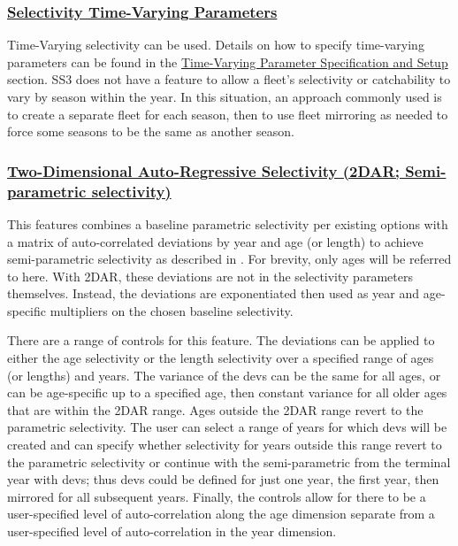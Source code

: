 \hypertarget{Selex-TV}{}
\subsubsection[Selectivity Time-Varying Parameters]{\protect\hyperlink{Selex-TV}{Selectivity Time-Varying Parameters}}
Time-Varying selectivity can be used. Details on how to specify time-varying parameters can be found in the \hyperlink{tvOrder}{Time-Varying Parameter Specification and Setup} section. SS3 does not have a feature to allow a fleet's selectivity or catchability to vary by season within the year. In this situation, an approach commonly used is to create a separate fleet for each season, then to use fleet mirroring as needed to force some seasons to be the same as another season.

\hypertarget{TwoDAR}{}
\subsubsection[Two-Dimensional Auto-Regressive Selectivity (2DAR; Semi-parametric selectivity)]{\protect\hyperlink{TwoDAR}{Two-Dimensional Auto-Regressive Selectivity (2DAR; Semi-parametric selectivity)}}
This features combines a baseline parametric selectivity per existing options with a matrix of auto-correlated deviations by year and age (or length) to achieve semi-parametric selectivity as described in \citet{xu-new-2019}. For brevity, only ages will be referred to here. With 2DAR, these deviations are not in the selectivity parameters themselves. Instead, the deviations are exponentiated then used as year and age-specific multipliers on the chosen baseline selectivity.

There are a range of controls for this feature. The deviations can be applied to either the age selectivity or the length selectivity over a specified range of ages (or lengths) and years. The variance of the devs can be the same for all ages, or can be age-specific up to a specified age, then constant variance for all older ages that are within the 2DAR range. Ages outside the 2DAR range revert to the parametric selectivity. The user can select a range of years for which devs will be created and can specify whether selectivity for years outside this range revert to the parametric selectivity or continue with the semi-parametric from the terminal year with devs; thus devs could be defined for just one year, the first year, then mirrored for all subsequent years. Finally, the controls allow for there to be a user-specified level of auto-correlation along the age dimension separate from a user-specified level of auto-correlation in the year dimension.

